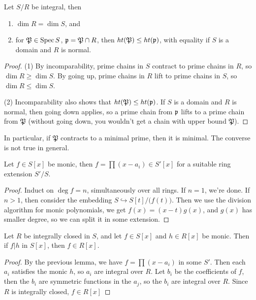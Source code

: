  \begin{theorem}
   Let $S/R$ be integral, then
   \begin{enumerate}
     \item $\dim R = \dim S$, and
     \item for $\mathfrak{P}\in \operatorname{Spec} S$, $\mathfrak{p}=\mathfrak{P}\cap R$, then
     $ht(\mathfrak{P})\le ht(\mathfrak{p})$, with equality if $S$ is a domain and $R$ is normal.
   \end{enumerate}
 \end{theorem}
 \begin{proof}
   (1) By incomparability, prime chains in $S$ contract to prime chains in $R$, so $\dim
   R\ge \dim S$. By going up, prime chains in $R$ lift to prime chains in $S$, so $\dim
   R\le \dim S$.

   (2) Incomparability also shows that $ht(\mathfrak{P})\le ht(\mathfrak{p})$. If $S$ is a domain
   and $R$ is normal, then going down applies, so a prime chain from $\mathfrak{p}$ lifts to a
   prime chain from $\mathfrak{P}$ (without going down, you wouldn't get a chain with
   upper bound $\mathfrak{P}$).
 \end{proof}
 In particular, if $\mathfrak{P}$ contracts to a minimal prime, then it is minimal. The
 converse is not true in general.

 \begin{lemma}
   Let $f\in S[x]$ be monic, then $f=\prod (x-a_i)\in S'[x]$ for a suitable ring
   extension $S'/S$.
 \end{lemma}
 \begin{proof}
   Induct on $\deg f=n$, simultaneously over all rings. If $n=1$, we're done. If $n>1$,
   then consider the embedding $S\hookrightarrow S[t]/\bigl(f(t)\bigr)$. Then we use the
   division algorithm for monic polynomials, we get $f(x)=(x-t)g(x)$, and $g(x)$ has
   smaller degree, so we can split it in some extension.
 \end{proof}
 \begin{lemma}
   Let $R$ be integrally closed in $S$, and let $f\in S[x]$ and $h\in R[x]$ be monic.
   Then if $f|h$ in $S[x]$, then $f\in R[x]$.
 \end{lemma}
 \begin{proof}
   By the previous lemma, we have $f=\prod (x-a_i)$ in some $S'$. Then each $a_i$
   satisfies the monic $h$, so $a_i$ are integral over $R$. Let $b_i$ be the coefficients
   of $f$, then the $b_i$ are symmetric functions in the $a_j$, so the $b_i$ are integral
   over $R$. Since $R$ is integrally closed, $f\in R[x]$
 \end{proof}
